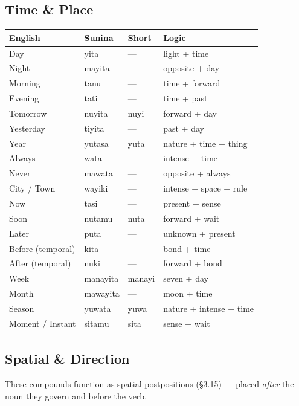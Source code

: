 \documentclass[12pt, a4paper]{article}
\begin{document}
\subsection{Time \& Place}
\begin{tabular}{@{}llll@{}}
\toprule
\textbf{English} & \textbf{Sunina} & \textbf{Short} & \textbf{Logic} \\ \midrule
Day & yita & --- & light + time \\
Night & mayita & --- & opposite + day \\
Morning & tanu & --- & time + forward \\
Evening & tati & --- & time + past \\
Tomorrow & nuyita & nuyi & forward + day \\
Yesterday & tiyita & --- & past + day \\
Year & yutasa & yuta & nature + time + thing \\
Always & wata & --- & intense + time \\
Never & mawata & --- & opposite + always \\
City / Town & wayiki & --- & intense + space + rule \\
Now & tasi & --- & present + sense \\
Soon & nutamu & nuta & forward + wait \\
Later & puta & --- & unknown + present \\
Before (temporal) & kita & --- & bond + time \\
After (temporal) & nuki & --- & forward + bond \\
Week & manayita & manayi & seven + day \\
Month & mawayita & --- & moon + time \\
Season & yuwata & yuwa & nature + intense + time \\
Moment / Instant & sitamu & sita & sense + wait \\
\bottomrule
\end{tabular}

\subsection{Spatial \& Direction}
These compounds function as spatial postpositions (\S3.15) --- placed \textit{after} the noun they govern and before the verb.
\end{document}
